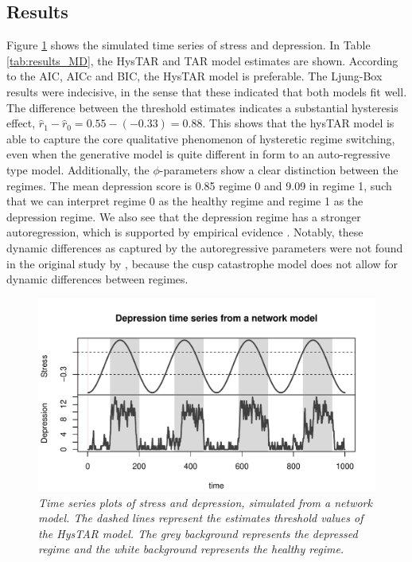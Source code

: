 \documentclass{article}
\begin{document}
\subsection{Results}
Figure \ref{fig:ts_plot_MD} shows the simulated time series of stress and depression.
In Table \ref{tab:results_MD}, the HysTAR and TAR model estimates are shown.
According to the AIC, AICc and BIC, the HysTAR model is preferable.
The Ljung-Box results were indecisive, in the sense that these indicated that both models fit well.
The difference between the threshold estimates indicates a substantial hysteresis effect, $\hat{r}_1 - \hat{r}_0 = 0.55 - (-0.33) = 0.88$.
This shows that the hysTAR model is able to capture the core qualitative phenomenon of hysteretic regime switching, even when the generative model is quite different in form to an auto-regressive type model.
Additionally, the $\phi$-parameters show a clear distinction between the regimes. The mean depression score is 0.85 regime 0 and 9.09 in regime 1,
such that we can interpret regime 0 as the healthy regime and regime 1 as the depression regime. We also see that the depression regime has a stronger autoregression, which is supported by empirical evidence \citep{kuppens_emotional_2010, koval_getting_2012}.
Notably, these dynamic differences as captured by the autoregressive parameters were not found in the original study by \citet{cramer_major_2016}, because the cusp catastrophe model does not allow for dynamic differences between regimes. 

\begin{figure} 
\begin{center}
\includegraphics[scale=.7]{MD_plot}
\caption{\textit{Time series plots of stress and depression, simulated from a network model. The dashed lines represent the estimates threshold values of the HysTAR model. The grey background represents the depressed regime and the white background represents the healthy regime.}}
\label{fig:ts_plot_MD}
\end{center}
\end{figure}
\end{document}
